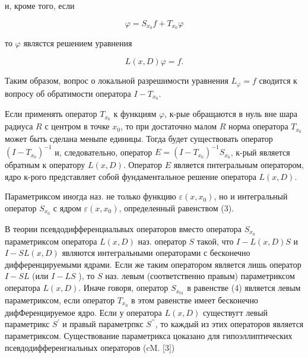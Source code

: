 \documentclass[10pt]{article}
\begin{document}
и, кроме того, если



\[

\varphi=S_{x_{0}} f+T_{x_{0}} \varphi

\]



то $\varphi$ являстся решением уравнения



\[

L(x, D) \varphi=f .

\]



Таким образом, вопрос о локальной разрешимости уравнения $L_{\varphi}=f$ сводится к вопросу об обратимости оператора $I-T_{x_{0}}$.



Если применять оператор $T_{x_{0}}$ к функциям $\varphi$, к-рые обращаются в нуль вне шара радиуса $R$ с центром в точке $x_{0}$, то при достаточно малом $R$ норма оператора $T_{x_{0}}$ может быть сделана меныпе единицы. Тогда будет существовать оператор $\left(I-T_{x_{0}}\right)^{-1}$ и, следовательно, оператор $E=\left(I-T_{x_{0}}\right)^{-1} S_{x_{0}}$, к-рый является обратным к оператору $L(x, D)$. Оператор $E$ является пнтегральным оператором, ядро к-рого представляет собой фундаментальное решение оператора $L(x, D)$.



Параметриксом иногда наз. не только функцию $\varepsilon\left(x, x_{0}\right)$, но и интегральный оператор $S_{x_{0}}$ с ядром $\varepsilon\left(x, x_{0}\right)$, определенный равенством (3).



В теории псевдодифференциальвых операторов вместо оператора $S_{x_{0}}$ параметриксом оператора $L(x, D)$ наз. оператор $S$ такой, что $I-L(x, D) S$ и $I-S L(x, D)$ являются интегральными операторами с бесконечно дифференцируемыми ядрами. Если же таким оператором является лишь оператор $I-S L$ (или $I-L S$ ), то $S$ наз. левым (соответственно правым) параметриксом оператора $L(x, D)$. Иначе говоря, оператор $S_{x_{01}}$ в равенстве (4) является левым параметриксом, если оператор $T_{x_{0}}$ в этом равенстве имеет бесконечно дифФеренцируемое ядро. Если у оператора $L(x, D)$ существугт левый параметрикс $S^{\prime}$ и правый параметрпкс $S^{\prime \prime}$, то каждый из этих операторов является параметриксом. Существование параметрикса цоказано для гипоэллиптических псевдодифференгиальных операторов (cM. [3])
\end{document}
